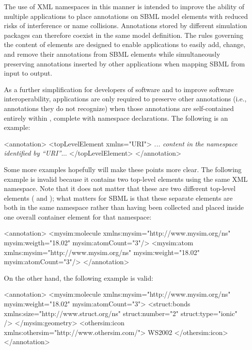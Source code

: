 The use of XML namespaces in this manner is intended to improve
the ability of multiple applications to place annotations on SBML
model elements with reduced risks of interference or name
collisions.  Annotations stored by different simulation packages
can therefore coexist in the same model definition.  The rules
governing the content of  elements are designed
to enable applications to easily add, change, and remove their
annotations from SBML elements while simultaneously preserving
annotations inserted by other applications when mapping SBML from
input to output.

As a further simplification for developers of software and to
improve software interoperability, applications are only required
to preserve other annotations (i.e., annotations they do not
recognize) when those annotations are self-contained entirely
within , complete with namespace declarations.
The following is an example:

\begin{example}
<annotation>
    <topLevelElement xmlns="URI">
       \textrm{\emph{... content in the namespace identified by \textquotedblleft{}URI\textquotedblright}...}
    </topLevelElement>
</annotation>
\end{example}

Some more examples hopefully will make these points more clear.
The following example is invalid because it contains two top-level
elements using the same XML namespace.  Note that it does not
matter that these are two different top-level elements
( and ); what matters for
SBML is that these separate elements are both in the same
namespace rather than having been collected and placed inside one
overall container element for that namespace:

\begin{example}
<annotation>
    <mysim:molecule xmlns:mysim="http://www.mysim.org/ns"
        mysim:weigth="18.02" mysim:atomCount="3"/>
    <mysim:atom xmlns:mysim="http://www.mysim.org/ns"
        mysim:weight="18.02" mysim:atomCount="3"/>
</annotation>
\end{example}

On the other hand, the following example is valid:

\begin{example}
<annotation>
    <mysim:molecule xmlns:mysim="http://www.mysim.org/ns"
             mysim:weight="18.02" mysim:atomCount="3">
        <struct:bonds xmlns:size="http://www.struct.org/ns" 
             struct:number="2" struct:type="ionic" />
    </mysim:geometry>
    <othersim:icon xmlns:othersim="http://www.othersim.com/">
        WS2002
    </othersim:icon>
</annotation>
\end{example}

